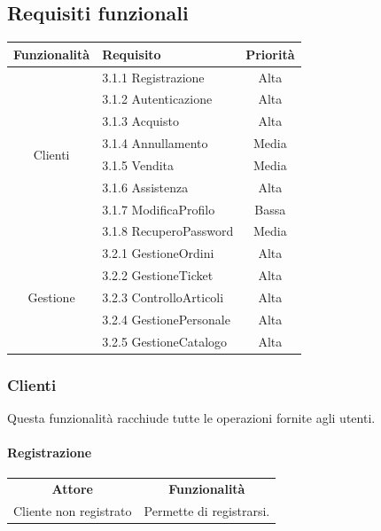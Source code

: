 \documentclass[12pt]{article}
\begin{document}
\subsection{Requisiti funzionali}
\begin{center}
\begin{tabular}{|c|l|c|}
\hline
\rowcolor[gray]{0.8}
\textbf{Funzionalità} & \textbf{Requisito} & \textbf{Priorità} \\
\hline
\multirow{8}{*}{Clienti} & 3.1.1 Registrazione & Alta \\
& 3.1.2 Autenticazione & Alta \\
& 3.1.3 Acquisto & Alta \\
& 3.1.4 Annullamento & Media \\
& 3.1.5 Vendita & Media \\
& 3.1.6 Assistenza & Alta \\
& 3.1.7 ModificaProfilo & Bassa \\
& 3.1.8 RecuperoPassword & Media \\
\hline
\multirow{5}{*}{Gestione} & 3.2.1 GestioneOrdini & Alta \\
& 3.2.2 GestioneTicket & Alta \\
& 3.2.3 ControlloArticoli & Alta \\
& 3.2.4 GestionePersonale & Alta \\
& 3.2.5 GestioneCatalogo & Alta \\

\hline
\end{tabular}
\end{center}

\subsubsection{Clienti}
Questa funzionalità racchiude tutte le operazioni fornite agli utenti.

\paragraph*{Registrazione}
\begin{center}
\begin{tabular}{|c|c|}
\rowcolor[gray]{0.8}
\hline
\textbf{Attore} & \textbf{Funzionalità} \\
Cliente non registrato & Permette di registrarsi. \\
\hline
\end{tabular}
\end{center}
\end{document}
